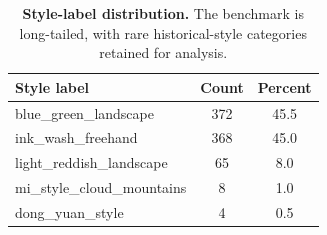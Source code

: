 \begin{table}[t]
\centering
\small
\caption{\textbf{Style-label distribution.} The benchmark is long-tailed, with rare historical-style categories retained for analysis.}
\label{tab:dataset-style-distribution}
\begin{tabular}{lcc}
\toprule
\textbf{Style label} & \textbf{Count} & \textbf{Percent} \\
\midrule
blue\_green\_landscape & 372 & 45.5 \\
ink\_wash\_freehand & 368 & 45.0 \\
light\_reddish\_landscape & 65 & 8.0 \\
mi\_style\_cloud\_mountains & 8 & 1.0 \\
dong\_yuan\_style & 4 & 0.5 \\
\bottomrule
\end{tabular}
\end{table}
